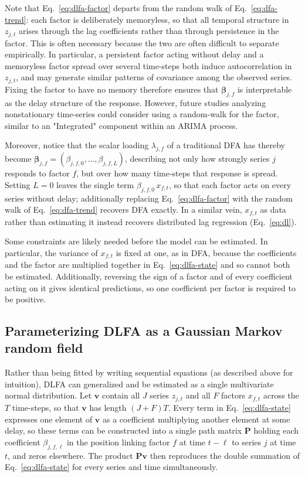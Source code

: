 \documentclass[12pt]{article}
\begin{document}
Note that Eq.~\ref{eq:dlfa-factor} departs from the random walk of
Eq.~\ref{eq:dfa-trend}: each factor is deliberately memoryless, so that
all temporal structure in $z_{j,t}$ arises through the lag coefficients
rather than through persistence in the factor. This is often necessary
because the two are often difficult to separate empirically. In
particular, a persistent factor acting without delay and a memoryless
factor spread over several time-steps both induce autocorrelation in
$z_{j,t}$, and may generate similar patterns of covariance among the
observed series. Fixing the factor to have no memory therefore ensures
that $\boldsymbol\beta_{j,f}$ is interpretable as the delay structure of
the response. However, future studies analyzing nonstationary
time-series could consider using a random-walk for the factor, similar
to an "Integrated" component within an ARIMA process.

Moreover, notice that the scalar loading $\lambda_{j,f}$ of a
traditional DFA has thereby become $\boldsymbol\beta_{j,f} =
(\beta_{j,f,0},\dots,\beta_{j,f,L})$, describing not only how strongly
series $j$ responds to factor $f$, but over how many time-steps that
response is spread. Setting $L = 0$ leaves the single term
$\beta_{j,f,0}\,x_{f,t}$, so that each factor acts on every series
without delay; additionally replacing Eq.~\ref{eq:dlfa-factor} with the
random walk of Eq.~\ref{eq:dfa-trend} recovers DFA exactly. In a similar
vein, $x_{f,t}$ as data rather than estimating it instead recovers
distributed lag regression (Eq.~\ref{eq:dl}).

Some constraints are likely needed before the model can be estimated. In
particular, the variance of $x_{f,t}$ is fixed at one, as in DFA,
because the coefficients and the factor are multiplied together in
Eq.~\ref{eq:dlfa-state} and so cannot both be estimated. Additionally,
reversing the sign of a factor and of every coefficient acting on it
gives identical predictions, so one coefficient per factor is required
to be positive.

\subsection{Parameterizing DLFA as a Gaussian Markov random field}

Rather than being fitted by writing sequential equations (as described
above for intuition), DLFA can generalized and be estimated as a single
multivariate normal distribution. Let $\mathbf{v}$ contain all $J$
series $z_{j,t}$ and all $F$ factors $x_{f,t}$ across the $T$
time-steps, so that $\mathbf{v}$ has length $(J+F)T$. Every term in
Eq.~\ref{eq:dlfa-state} expresses one element of $\mathbf{v}$ as a
coefficient multiplying another element at some delay, so these terms
can be constructed into a single path matrix $\mathbf{P}$ holding each
coefficient $\beta_{j,f,\ell}$ in the position linking factor $f$ at
time $t-\ell$ to series $j$ at time $t$, and zeros elsewhere. The
product $\mathbf{P}\mathbf{v}$ then reproduces the double summation of
Eq.~\ref{eq:dlfa-state} for every series and time simultaneously.
\end{document}
